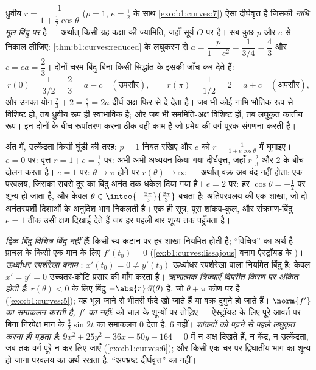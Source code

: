 \begin{example}
\label{ex:b1:curves:orbit}
ध्रुवीय  $r = \dfrac{1}{1 + \frac12\cos\theta}$ ($p = 1$, $e = \frac12$
के साथ \cref{exo:b1:curves:7}) ऐसा दीर्घवृत्त है जिसकी \emph{नाभि मूल बिंदु
पर} है --- अर्थात् किसी ग्रह-कक्षा की ज्यामिति, जहाँ सूर्य $O$ पर है। सब कुछ
$p$ और $e$ से निकाल लीजिए: \cref{thm:b1:curves:reduced} के लघुकरण से $a =
\dfrac{p}{1 - e^2} = \dfrac{1}{3/4} = \dfrac43$ और $c = ea = \dfrac23$।
दोनों चरम बिंदु बिना किसी सिद्धांत के इसकी जाँच कर देते हैं:
\[
r(0) = \frac{1}{3/2} = \frac23 = a - c
\quad (\text{उपसौर}),
\qquad
r(\pi) = \frac{1}{1/2} = 2 = a + c
\quad (\text{अपसौर}),
\]
और उनका योग $\frac23 + 2 = \frac83 = 2a$ दीर्घ अक्ष फिर से दे देता है। जब भी
कोई नाभि भौतिक रूप से विशिष्ट हो, तब ध्रुवीय रूप ही स्वाभाविक है; और जब भी
सममिति-अक्ष विशिष्ट हों, तब लघुकृत कार्तीय रूप। इन दोनों के बीच रूपांतरण
करना ठीक वही काम है जो प्रमेय की वर्ग-पूरक संगणना करती है।

अंत में, उत्केंद्रता किसी घुंडी की तरह: $p = 1$ नियत रखिए और $e$ को $r =
\frac{1}{1 + e\cos\theta}$ में घुमाइए। $e = 0$ पर: वृत्त $r = 1$। $e =
\frac12$ पर: अभी-अभी अध्ययन किया गया दीर्घवृत्त, जहाँ $r$ $\frac23$ और $2$
के बीच दोलन करता है। $e = 1$ पर: $\theta \to \pi$ होने पर $r(\theta) \to
\infty$ --- अर्थात् वक्र अब बंद नहीं होता: एक परवलय, जिसका सबसे दूर का बिंदु
अनंत तक धकेल दिया गया है। $e = 2$ पर: हर $\cos\theta = -\frac12$ पर शून्य हो
जाता है, और केवल $\theta \in \intoo{-\frac{2\pi}3}{\frac{2\pi}3}$ बचता है:
अतिपरवलय की एक शाखा, जो दो अनंतस्पर्शी दिशाओं के अनुदिश भाग निकलती है। एक ही
सूत्र, पूरा शांकव-कुल, और संक्रमण-बिंदु $e = 1$ ठीक उसी क्षण दिखाई देते हैं
जब हर पहली बार शून्य तक पहुँचता है।
\end{example}

\begin{remark}[सामान्य भूलें]
\label{rem:b1:curves:pitfalls}
\emph{द्विक बिंदु विचित्र बिंदु नहीं हैं}: किसी स्व-कटान पर हर शाखा नियमित
होती है; ``विचित्र'' का अर्थ है प्राचल के किसी एक मान के लिए $f'(t_0) = 0$
(\cref{ex:b1:curves:lissajous} बनाम ऐस्ट्रॉयड के )। \emph{ऊर्ध्वाधर
स्पर्शरेखा बनाम }: $x'(t_0) = 0 \neq y'(t_0)$ ऊर्ध्वाधर स्पर्शरेखा
वाला नियमित बिंदु है; केवल $x' = y' = 0$ उच्चतर-कोटि प्रसार की माँग करता है।
\emph{ऋणात्मक त्रिज्याएँ विपरीत किरण पर अंकित होती हैं}: $r(\theta) < 0$ के
लिए बिंदु $-\abs{r}\,\vec u(\theta)$ है, जो $\theta + \pi$ कोण पर है
(\cref{exo:b1:curves:5}); यह भूल जाने से भीतरी फंदे खो जाते हैं या वक्र
दुगुने हो जाते हैं। \emph{ $\norm{f'}$ का समाकलन करती है, $f'$ का
नहीं}:  को चाल के शून्यों पर तोड़िए --- ऐस्ट्रॉयड के लिए पूरे आवर्त पर
बिना निरपेक्ष मान के $\frac32\sin 2t$ का समाकलन $0$ देता है, $6$ नहीं।
\emph{शांकवों को पढ़ने से पहले लघुकृत करना ही पड़ता है}: $9x^2 + 25y^2 - 36x
- 50y - 164 = 0$ में न अक्ष दिखते हैं, न केंद्र, न उत्केंद्रता, जब तक वर्ग
पूरे न कर लिए जाएँ (\cref{exo:b1:curves:6}); और किसी एक चर पर द्विघातीय भाग
का शून्य हो जाना परवलय का अर्थ रखता है, ``अपभ्रष्ट दीर्घवृत्त'' का नहीं।
\end{remark}

